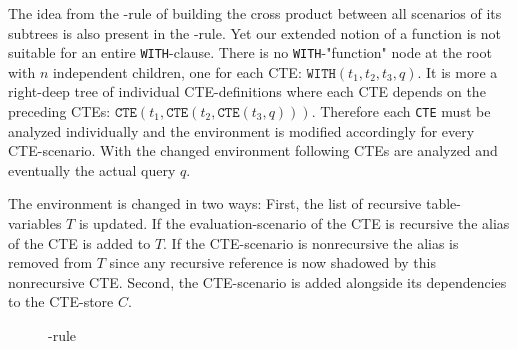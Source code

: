 The idea from the \REXPR-rule of building the cross product between all scenarios of its subtrees is also present in the \RCTE-rule. Yet our extended notion of a function is not suitable for an entire \texttt{WITH}-clause. There is no \texttt{WITH}-"function" node at the root with $n$ independent children, one for each CTE: $\texttt{WITH}(t_1, t_2, t_3, q)$. It is more a right-deep tree of individual CTE-definitions where each CTE depends on the preceding CTEs: $\texttt{CTE}(t_1, \texttt{CTE}(t_2, \texttt{CTE}(t_3, q)))$. Therefore each \texttt{CTE} must be analyzed individually and the environment is modified accordingly for every CTE-scenario. With the changed environment following CTEs are analyzed and eventually the actual query $q$.

The environment is changed in two ways: First, the list of recursive table-variables $T$ is updated. If the evaluation-scenario of the CTE is recursive the alias of the CTE is added to $T$. If the CTE-scenario is nonrecursive the alias is removed from $T$ since any recursive reference is now shadowed by this nonrecursive CTE. Second, the CTE-scenario is added alongside its dependencies to the CTE-store $C$.

\begin{figure}[h!]
    \centering\footnotesize
{}
    \caption{\RCTE-rule}
    \label{rule:cte}
\end{figure}

